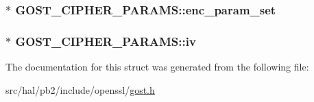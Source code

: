 \subsubsection[{\texorpdfstring{enc\+\_\+param\+\_\+set}{enc_param_set}}]{$\ast$ G\+O\+S\+T\+\_\+\+C\+I\+P\+H\+E\+R\+\_\+\+P\+A\+R\+A\+M\+S\+::enc\+\_\+param\+\_\+set}\hypertarget{struct_g_o_s_t___c_i_p_h_e_r___p_a_r_a_m_s_a95cc25522ba9c144283fa45771d941a4}{}\label{struct_g_o_s_t___c_i_p_h_e_r___p_a_r_a_m_s_a95cc25522ba9c144283fa45771d941a4}
\subsubsection[{\texorpdfstring{iv}{iv}}]{$\ast$ G\+O\+S\+T\+\_\+\+C\+I\+P\+H\+E\+R\+\_\+\+P\+A\+R\+A\+M\+S\+::iv}\hypertarget{struct_g_o_s_t___c_i_p_h_e_r___p_a_r_a_m_s_a0e28f39e8c9d722b9648eac967e514c4}{}\label{struct_g_o_s_t___c_i_p_h_e_r___p_a_r_a_m_s_a0e28f39e8c9d722b9648eac967e514c4}


The documentation for this struct was generated from the following file\+:\begin{DoxyCompactItemize}
\item 
src/hal/pb2/include/openssl/\hyperlink{gost_8h}{gost.\+h}\end{DoxyCompactItemize}
